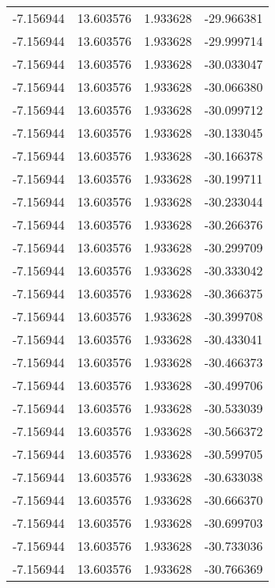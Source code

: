 \begin{tabular}{rrrr}
       -7.156944 &        13.603576 &    1.933628 & -29.966381 \\
       -7.156944 &        13.603576 &    1.933628 & -29.999714 \\
       -7.156944 &        13.603576 &    1.933628 & -30.033047 \\
       -7.156944 &        13.603576 &    1.933628 & -30.066380 \\
       -7.156944 &        13.603576 &    1.933628 & -30.099712 \\
       -7.156944 &        13.603576 &    1.933628 & -30.133045 \\
       -7.156944 &        13.603576 &    1.933628 & -30.166378 \\
       -7.156944 &        13.603576 &    1.933628 & -30.199711 \\
       -7.156944 &        13.603576 &    1.933628 & -30.233044 \\
       -7.156944 &        13.603576 &    1.933628 & -30.266376 \\
       -7.156944 &        13.603576 &    1.933628 & -30.299709 \\
       -7.156944 &        13.603576 &    1.933628 & -30.333042 \\
       -7.156944 &        13.603576 &    1.933628 & -30.366375 \\
       -7.156944 &        13.603576 &    1.933628 & -30.399708 \\
       -7.156944 &        13.603576 &    1.933628 & -30.433041 \\
       -7.156944 &        13.603576 &    1.933628 & -30.466373 \\
       -7.156944 &        13.603576 &    1.933628 & -30.499706 \\
       -7.156944 &        13.603576 &    1.933628 & -30.533039 \\
       -7.156944 &        13.603576 &    1.933628 & -30.566372 \\
       -7.156944 &        13.603576 &    1.933628 & -30.599705 \\
       -7.156944 &        13.603576 &    1.933628 & -30.633038 \\
       -7.156944 &        13.603576 &    1.933628 & -30.666370 \\
       -7.156944 &        13.603576 &    1.933628 & -30.699703 \\
       -7.156944 &        13.603576 &    1.933628 & -30.733036 \\
       -7.156944 &        13.603576 &    1.933628 & -30.766369 \\

\end{tabular}
